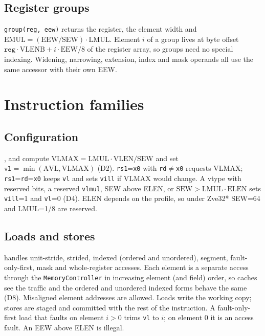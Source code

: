 \documentclass[11pt]{article}
\begin{document}
\subsection{Register groups}

\texttt{group(reg, eew)} returns the register, the element width and
$\mathrm{EMUL} = (\mathrm{EEW}/\mathrm{SEW})\cdot\mathrm{LMUL}$. Element $i$ of a group lives at
byte offset $\texttt{reg}\cdot\mathrm{VLENB} + i\cdot\mathrm{EEW}/8$ of the register array, so
groups need no special indexing. Widening, narrowing, extension, index and mask operands all use
the same accessor with their own EEW.

\section{Instruction families}\label{sec:families}

\subsection{Configuration}
,  and  compute
$\mathrm{VLMAX} = \mathrm{LMUL}\cdot\mathrm{VLEN}/\mathrm{SEW}$ and set
$\texttt{vl} = \min(\mathrm{AVL}, \mathrm{VLMAX})$ (D2). \texttt{rs1}=\texttt{x0} with
\texttt{rd}$\neq$\texttt{x0} requests VLMAX; \texttt{rs1}=\texttt{rd}=\texttt{x0} keeps
\texttt{vl} and sets \texttt{vill} if VLMAX would change. A vtype with reserved bits, a reserved
\texttt{vlmul}, SEW above ELEN, or $\mathrm{SEW} > \mathrm{LMUL}\cdot\mathrm{ELEN}$ sets
\texttt{vill}=1 and \texttt{vl}=0 (D4). ELEN depends on the profile, so under Zve32* SEW=64 and
LMUL=1/8 are reserved.

\subsection{Loads and stores}
 handles unit-stride, strided, indexed (ordered and unordered),
segment, fault-only-first, mask and whole-register accesses. Each element is a separate access
through the \texttt{MemoryController} in increasing element (and field) order, so caches see the
traffic and the ordered and unordered indexed forms behave the same (D8). Misaligned element
addresses are allowed. Loads write the working copy; stores are staged and committed with the
rest of the instruction. A fault-only-first load that faults on element $i>0$ trims
\texttt{vl} to $i$; on element 0 it is an access fault. An EEW above ELEN is illegal.
\end{document}
